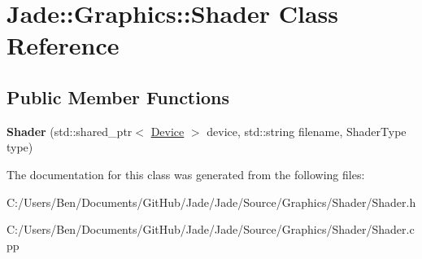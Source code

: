 \hypertarget{class_jade_1_1_graphics_1_1_shader}{}\section{Jade\+:\+:Graphics\+:\+:Shader Class Reference}
\label{class_jade_1_1_graphics_1_1_shader}
\subsection*{Public Member Functions}
\begin{DoxyCompactItemize}
\item 
\hypertarget{class_jade_1_1_graphics_1_1_shader_ace7749bfe77e7249ab7801ec85ecf78a}{}{\bfseries Shader} (std\+::shared\+\_\+ptr$<$ \hyperlink{class_jade_1_1_graphics_1_1_device}{Device} $>$ device, std\+::string filename, Shader\+Type type)\label{class_jade_1_1_graphics_1_1_shader_ace7749bfe77e7249ab7801ec85ecf78a}

\end{DoxyCompactItemize}


The documentation for this class was generated from the following files\+:\begin{DoxyCompactItemize}
\item 
C\+:/\+Users/\+Ben/\+Documents/\+Git\+Hub/\+Jade/\+Jade/\+Source/\+Graphics/\+Shader/Shader.\+h\item 
C\+:/\+Users/\+Ben/\+Documents/\+Git\+Hub/\+Jade/\+Jade/\+Source/\+Graphics/\+Shader/Shader.\+cpp\end{DoxyCompactItemize}
